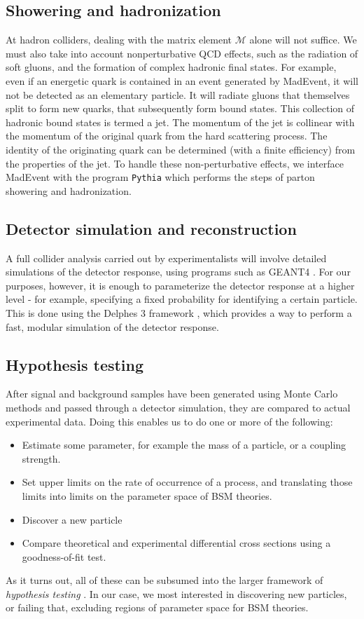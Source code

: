 \subsection{Showering and hadronization}
At hadron colliders, dealing with the matrix element $\mathcal{M}$ alone will not suffice. We must also take into account nonperturbative QCD effects, such as the radiation of soft gluons, and the formation of complex hadronic final states. For example, even if an energetic quark is contained in an event generated by MadEvent, it will not be detected as an elementary particle. It will radiate gluons that themselves split to form new quarks, that subsequently form bound states. This collection of hadronic bound states is termed a jet. The momentum of the jet is collinear with the momentum of the original quark from the hard scattering process. The identity of the originating quark can be determined (with a finite efficiency) from the properties of the jet. To handle these non-perturbative effects, we interface MadEvent with the program \texttt{Pythia}\citep{Sjostrand2006} which performs the steps of parton showering and hadronization.
\subsection{Detector simulation and reconstruction}
A full collider analysis carried out by experimentalists will involve detailed simulations of the detector response, using programs such as GEANT4 \citep{Agostinelli2003}. For our purposes, however, it is enough to parameterize the detector response at a higher level - for example, specifying a fixed probability for identifying a certain particle. This is done using the Delphes 3 framework \citep{DeFavereau2014a}, which provides a way to perform a fast, modular simulation of the detector response. 
\subsection{Hypothesis testing}
After signal and background samples have been generated using Monte Carlo methods and passed through a detector simulation, they are compared to actual experimental data. Doing this enables us to do one or more of the following:
\begin{itemize}
  \item Estimate some parameter, for example the mass of a particle, or a coupling strength.
  \item Set upper limits on the rate of occurrence of a process, and translating those limits into limits on the parameter space of BSM theories.
  \item Discover a new particle
  \item Compare theoretical and experimental differential cross sections using a goodness-of-fit test.
\end{itemize}
As it turns out, all of these can be subsumed into the larger framework of \emph{hypothesis testing} \citep{Heinrich}. In our case, we most interested in discovering new particles, or failing that, excluding regions of parameter space for BSM theories.


